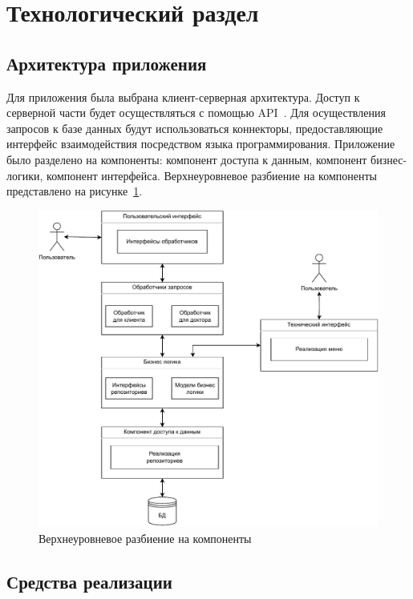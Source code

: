 \section{Технологический раздел}

\subsection{Архитектура приложения}

Для приложения была выбрана клиент-серверная архитектура. Доступ к серверной части будет осуществляться с помощью API~\cite{api}. Для осуществления запросов к базе данных будут использоваться коннекторы, предоставляющие интерфейс взаимодействия посредством языка программирования. Приложение было разделено на компоненты: компонент доступа к данным, компонент бизнес-логики, компонент интерфейса. Верхнеуровневое разбиение на компоненты представлено на рисунке~\ref{img:upper}.
\begin{figure}[!h]
	\centering
	\includegraphics[width=165mm]{image/upper}
	\caption{Верхнеуровневое разбиение на компоненты}
	\label{img:upper}
\end{figure}

\newpage

\subsection{Средства реализации}

